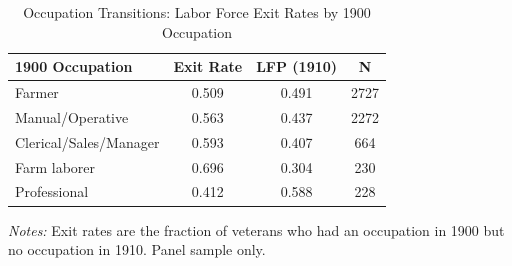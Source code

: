 \begin{table}[htbp]
\centering
\caption{Occupation Transitions: Labor Force Exit Rates by 1900 Occupation}
\label{tab:occupation}
\begin{tabular}{lccc}
\toprule
  1900 Occupation & Exit Rate & LFP (1910) & N \\
\midrule
  Farmer & 0.509 & 0.491 & 2727 \\
  Manual/Operative & 0.563 & 0.437 & 2272 \\
  Clerical/Sales/Manager & 0.593 & 0.407 & 664 \\
  Farm laborer & 0.696 & 0.304 & 230 \\
  Professional & 0.412 & 0.588 & 228 \\
\bottomrule
\end{tabular}
\begin{tablenotes}[flushleft]
\small
\item \textit{Notes:} Exit rates are the fraction of veterans who had an occupation in 1900 but no occupation in 1910. Panel sample only.
\end{tablenotes}
\end{table}
